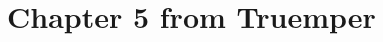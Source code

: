 \section{Chapter 5 from Truemper}

\begin{corollary}[]
  \label{cor:5.2.15}
  \uses{}
\end{corollary}
